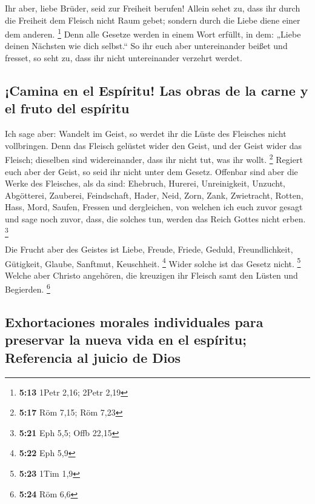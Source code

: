  Ihr aber, liebe Brüder, seid zur Freiheit berufen!
Allein sehet zu, dass ihr durch die Freiheit dem Fleisch nicht Raum
gebet; sondern durch die Liebe diene einer dem anderen. \footnote{\textbf{5:13}
  1Petr 2,16; 2Petr 2,19}  Denn alle Gesetze werden in
einem Wort erfüllt, in dem: „Liebe deinen Nächsten wie dich selbst.``
 So ihr euch aber untereinander beißet und fresset, so
seht zu, dass ihr nicht untereinander verzehrt werdet.

\hypertarget{camina-en-el-espuxedritu-las-obras-de-la-carne-y-el-fruto-del-espuxedritu}{%
\subsection{¡Camina en el Espíritu! Las obras de la carne y el fruto del
espíritu}\label{camina-en-el-espuxedritu-las-obras-de-la-carne-y-el-fruto-del-espuxedritu}}

 Ich sage aber: Wandelt im Geist, so werdet ihr die Lüste
des Fleisches nicht vollbringen.  Denn das Fleisch
gelüstet wider den Geist, und der Geist wider das Fleisch; dieselben
sind widereinander, dass ihr nicht tut, was ihr wollt. \footnote{\textbf{5:17}
  Röm 7,15; Röm 7,23}  Regiert euch aber der Geist, so
seid ihr nicht unter dem Gesetz.  Offenbar sind aber die
Werke des Fleisches, als da sind: Ehebruch, Hurerei, Unreinigkeit,
Unzucht,  Abgötterei, Zauberei, Feindschaft, Hader, Neid,
Zorn, Zank, Zwietracht, Rotten, Hass, Mord,  Saufen,
Fressen und dergleichen, von welchen ich euch zuvor gesagt und sage noch
zuvor, dass, die solches tun, werden das Reich Gottes nicht erben.
\footnote{\textbf{5:21} Eph 5,5; Offb 22,15}

 Die Frucht aber des Geistes ist Liebe, Freude, Friede,
Geduld, Freundlichkeit, Gütigkeit, Glaube, Sanftmut, Keuschheit.
\footnote{\textbf{5:22} Eph 5,9}  Wider solche ist das
Gesetz nicht. \footnote{\textbf{5:23} 1Tim 1,9}  Welche
aber Christo angehören, die kreuzigen ihr Fleisch samt den Lüsten und
Begierden. \footnote{\textbf{5:24} Röm 6,6}

\hypertarget{exhortaciones-morales-individuales-para-preservar-la-nueva-vida-en-el-espuxedritu-referencia-al-juicio-de-dios}{%
\subsection{Exhortaciones morales individuales para preservar la nueva
vida en el espíritu; Referencia al juicio de
Dios}\label{exhortaciones-morales-individuales-para-preservar-la-nueva-vida-en-el-espuxedritu-referencia-al-juicio-de-dios}}

